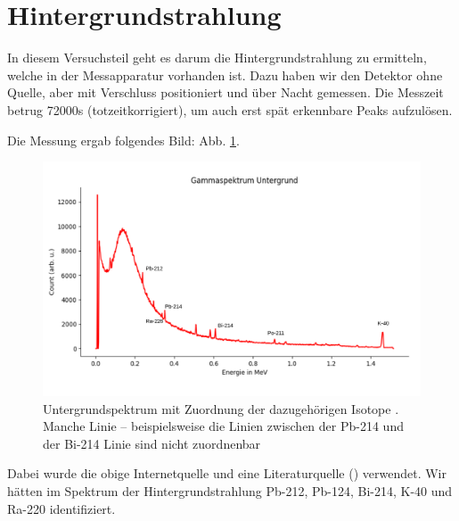 \clearpage
\section{Hintergrundstrahlung}

In diesem Versuchsteil geht es darum die Hintergrundstrahlung zu ermitteln, welche in der Messapparatur vorhanden ist. Dazu haben wir 
den Detektor ohne Quelle, aber mit Verschluss positioniert und über Nacht gemessen. Die Messzeit betrug 72000s (totzeitkorrigiert), um auch erst 
spät erkennbare Peaks aufzulösen. 

Die Messung ergab folgendes Bild: Abb. \ref{bild:untergrund}.

\begin{figure}[ht]
    \captionsetup{justification=centering,margin=2cm}
    \centering
    \includegraphics[angle = 90, width = 12cm]{Bilder/Auswertung/Untergrund.png}
    \caption{Untergrundspektrum mit Zuordnung der dazugehörigen Isotope \protect \footnotemark. Manche Linie – beispielsweise 
    die Linien zwischen der Pb-214 und der Bi-214 Linie sind nicht zuordnenbar}
    \label{bild:untergrund}
\end{figure}
Dabei wurde die obige Internetquelle und eine Literaturquelle (\cite{Mende2016}) verwendet.
Wir hätten im Spektrum der Hintergrundstrahlung Pb-212, Pb-124, Bi-214, K-40 und Ra-220 identifiziert.